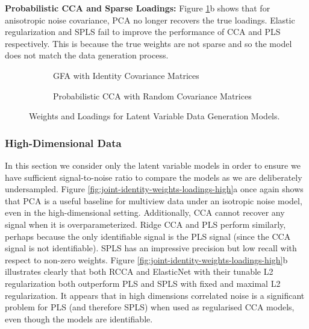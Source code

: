 \textbf{Probabilistic CCA and Sparse Loadings:} Figure \ref{fig:latent-variable-weights-loadings}b shows that for anisotropic noise covariance, PCA no longer recovers the true loadings.
Elastic regularization and SPLS fail to improve the performance of CCA and PLS respectively.
This is because the true weights are not sparse and so the model does not match the data generation process.

\begin{figure}
\centering
\begin{subfigure}{0.49\linewidth}
\centering

\caption{GFA with Identity Covariance Matrices}
\end{subfigure}
%
\begin{subfigure}{0.49\linewidth}
\centering

\caption{Probabilistic CCA with Random Covariance Matrices}
\end{subfigure}
\caption{Weights and Loadings for Latent Variable Data Generation Models.}
\label{fig:latent-variable-weights-loadings}
\end{figure}

\subsubsection{High-Dimensional Data}
In this section we consider only the latent variable models in order to ensure we have sufficient signal-to-noise ratio to compare the models as we are deliberately undersampled.
Figure \ref{fig:joint-identity-weights-loadings-high}a once again shows that PCA is a useful baseline for multiview data under an isotropic noise model, even in the high-dimensional setting.
Additionally, CCA cannot recover any signal when it is overparameterized.
Ridge CCA and PLS perform similarly, perhaps because the only identifiable signal is the PLS signal (since the CCA signal is not identifiable).
SPLS has an impressive precision but low recall with respect to non-zero weights.
Figure \ref{fig:joint-identity-weights-loadings-high}b illustrates clearly that both RCCA and ElasticNet with their tunable L2 regularization both outperform PLS and SPLS with fixed and maximal L2 regularization.
It appears that in high dimensions correlated noise is a significant problem for PLS (and therefore SPLS) when used as regularised CCA models, even though the models are identifiable.

